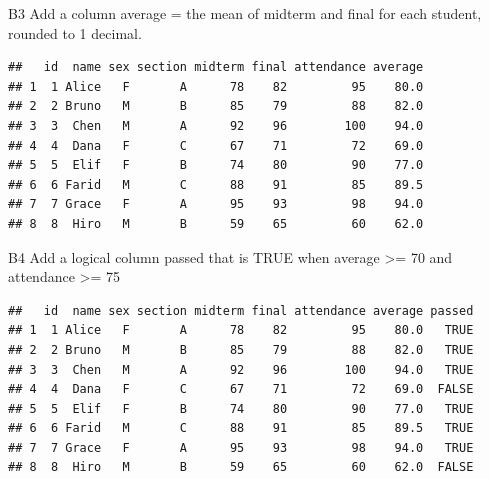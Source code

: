 \documentclass[
]{article}
\newenvironment{Shaded}{\begin{snugshade}}{\end{snugshade}}
\newcommand{\DecValTok}[1]{\textcolor[rgb]{0.00,0.00,0.81}{#1}}
\newcommand{\FunctionTok}[1]{\textcolor[rgb]{0.13,0.29,0.53}{\textbf{#1}}}
\newcommand{\NormalTok}[1]{#1}
\newcommand{\OtherTok}[1]{\textcolor[rgb]{0.56,0.35,0.01}{#1}}
\newcommand{\SpecialCharTok}[1]{\textcolor[rgb]{0.81,0.36,0.00}{\textbf{#1}}}
\begin{document}
B3 Add a column average = the mean of midterm and final for each
student, rounded to 1 decimal.

\begin{Shaded}
\end{Shaded}

\begin{verbatim}
##   id  name sex section midterm final attendance average
## 1  1 Alice   F       A      78    82         95    80.0
## 2  2 Bruno   M       B      85    79         88    82.0
## 3  3  Chen   M       A      92    96        100    94.0
## 4  4  Dana   F       C      67    71         72    69.0
## 5  5  Elif   F       B      74    80         90    77.0
## 6  6 Farid   M       C      88    91         85    89.5
## 7  7 Grace   F       A      95    93         98    94.0
## 8  8  Hiro   M       B      59    65         60    62.0
\end{verbatim}

B4 Add a logical column passed that is TRUE when average \textgreater=
70 and attendance \textgreater= 75

\begin{Shaded}
\end{Shaded}

\begin{verbatim}
##   id  name sex section midterm final attendance average passed
## 1  1 Alice   F       A      78    82         95    80.0   TRUE
## 2  2 Bruno   M       B      85    79         88    82.0   TRUE
## 3  3  Chen   M       A      92    96        100    94.0   TRUE
## 4  4  Dana   F       C      67    71         72    69.0  FALSE
## 5  5  Elif   F       B      74    80         90    77.0   TRUE
## 6  6 Farid   M       C      88    91         85    89.5   TRUE
## 7  7 Grace   F       A      95    93         98    94.0   TRUE
## 8  8  Hiro   M       B      59    65         60    62.0  FALSE
\end{verbatim}
\end{document}

